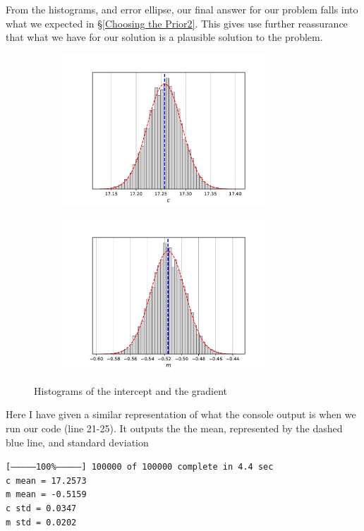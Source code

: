 \documentclass[12pt,twoside]{report}   %
\begin{document}
From the histograms, and error ellipse, our final answer for our problem falls into what we expected in \S\ref{Choosing the Prior2}. This gives use further reassurance that what we have for our solution is a plausible solution to the problem.
\begin{figure}[H]
\centering
\begin{subfigure}{0.5\linewidth}
  \centering
  \includegraphics[width = 3in]{Histc.pdf}
  \label{fig:subhist1}
\end{subfigure}%
\begin{subfigure}{0.5\linewidth}
  \centering
  \includegraphics[width = 3in]{Histm.pdf}
  \label{fig:subhist2}
\end{subfigure}
\caption{Histograms of the intercept and the gradient}
\label{fig:histograms1}
\end{figure}

Here I have given a similar representation of what the console output is when we run our code (line 21-25). It outputs the the mean, represented by the dashed blue line, and standard deviation 
\small \begin{tcolorbox}[colback=black!5,colframe=black!40!black,title=\texttt{Terminal}]
\texttt{[--------------100\%--------------] 100000 of 100000 complete in 4.4 sec\\
c mean = 17.2573\\
m mean = -0.5159\\
c std = 0.0347\\
m std = 0.0202}
\end{tcolorbox}
\end{document}
